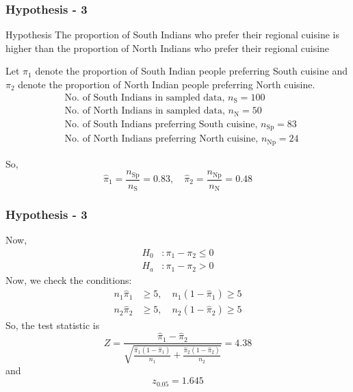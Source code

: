 \documentclass{beamer}
\begin{document}
\begin{frame}
    \frametitle{Hypothesis - 3}
    
    \begin{block}{Hypothesis}
       The proportion of South Indians who prefer their regional cuisine is higher than the proportion of North Indians who prefer their regional cuisine
    \end{block}
    Let $\pi_1$ denote the proportion of South Indian people preferring South cuisine and $\pi_2$ denote the proportion of North Indian people preferring North cuisine.
    \begin{align}
        &\text{No. of South Indians in sampled data, } n_{\text{S}} = 100 \\
        &\text{No. of North Indians in sampled data, } n_{\text{N}} = 50 \\
        &\text{No. of South Indians preferring South cuisine, } n_{\text{Sp}} = 83 \\
        &\text{No. of North Indians preferring North cuisine, } n_{\text{Np}} = 24
    \end{align}
    
    So,
    \begin{equation}
        \hat{\pi}_1 = \frac{n_{\text{Sp}}}{n_{\text{S}}} = 0.83, \quad \hat{\pi}_2 = \frac{n_{\text{Np}}}{n_{\text{N}}} = 0.48
    \end{equation}
\end{frame}
\begin{frame}
    \frametitle{Hypothesis - 3}
    Now,
    \begin{align}
        H_0 &: \pi_1 - \pi_2 \leq 0 \\
        H_a &: \pi_1 - \pi_2 > 0
    \end{align}
    Now, we check the conditions:
    \begin{align}
        n_1\hat{\pi}_1 &\geq 5, \quad n_1(1 - \hat{\pi}_1) \geq 5 \\
        n_2\hat{\pi}_2 &\geq 5, \quad n_2(1 - \hat{\pi}_2) \geq 5
    \end{align}
    So, the test statistic is
    \begin{equation}
        Z = \frac{\hat{\pi}_1 - \hat{\pi}_2}{\sqrt{\frac{\hat{\pi}_1(1-\hat{\pi}_1)}{n_1} + \frac{\hat{\pi}_2(1-\hat{\pi}_2)}{n_2}}} = 4.38
    \end{equation}
    and
    \begin{equation}
        z_{0.05} = 1.645
    \end{equation}
    
\end{frame}
\end{document}

